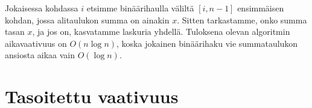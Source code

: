 Jokaisessa kohdassa $i$ etsimme binäärihaulla väliltä $[i,n-1]$
ensimmäisen kohdan, jossa alitaulukon summa on ainakin $x$.
Sitten tarkastamme, onko summa tasan $x$,
ja jos on, kasvatamme laskuria yhdellä.
Tuloksena olevan algoritmin aikavaativuus on $O(n \log n)$,
koska jokainen binäärihaku vie summataulukon ansiosta
aikaa vain $O(\log n)$.


\section{Tasoitettu vaativuus}

% 
% 
% 
% 
% 
% 
% 
